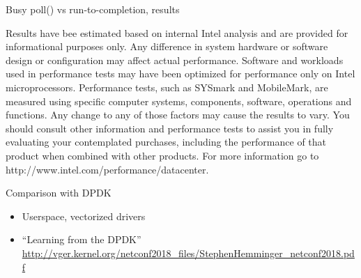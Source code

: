 \documentclass[aspectratio=169, xcolor=table]{beamer}
\begin{document}
  {%
  \begin{frame}{Busy poll() vs run-to-completion, results}
  \fontsize{3pt}{2pt}\selectfont
    \begin{center}\end{center}
  Results have bee estimated based on internal Intel analysis and are
  provided for informational purposes only. Any difference in system
  hardware or software design or configuration may affect actual
  performance. Software and workloads used in performance tests may
  have been optimized for performance only on Intel
  microprocessors. Performance tests, such as SYSmark and MobileMark,
  are measured using specific computer systems, components, software,
  operations and functions. Any change to any of those factors may
  cause the results to vary. You should consult other information and
  performance tests to assist you in fully evaluating your
  contemplated purchases, including the performance of that product
  when combined with other products. For more information go to
  http://www.intel.com/performance/datacenter.  
  \end{frame}
  }

  \begin{frame}{Comparison with DPDK}
    \begin{itemize}
      \item Userspace, vectorized drivers
      \item ``Learning from the DPDK''
        \url{http://vger.kernel.org/netconf2018_files/StephenHemminger_netconf2018.pdf}
    \end{itemize}
  \end{frame}
\end{document}
